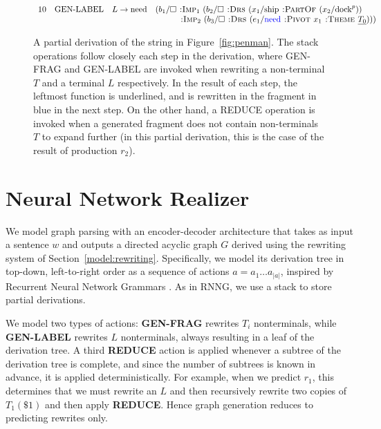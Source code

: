 \documentclass[11pt,a4paper]{article}
\theoremstyle{plain}
\begin{document}
\begin{figure*}
\begin{align*}
\begin{array}{rlll}
  10 & \textrm{GEN-LABEL} & L\rightarrow\textrm{need} &(b_1/\square \textsc{~:Imp}_1~(b_2/\square \textsc{~:Drs~} (x_1/\textrm{ship} \textsc{~:PartOf~} (x_2/\textrm{dock}^p))\\  
    & &  &\qquad~~\textsc{~:Imp}_2~(b_3/\square \textsc{~:Drs~} (e_1/\textcolor{blue}{\textrm{need}} \textsc{~:Pivot~} x_1 \textsc{~:Theme~} \underline{T_0})))
\end{array}
\end{align*}
\caption{A partial derivation of the string in Figure~\ref{fig:penman}. The stack operations follow closely each step in the derivation, where GEN-FRAG and GEN-LABEL are invoked when rewriting a non-terminal $T$ and a terminal $L$ respectively. In the result of each step, the leftmost function is underlined, and is rewritten in the fragment in blue in the next step. On the other hand, a REDUCE operation is invoked when a generated fragment does not contain non-terminals $T$ to expand further (in this partial derivation, this is the case of the result of production $r_2$).}
\label{fig:derivation}
\label{table:derivation}
\end{figure*}

\section{Neural Network Realizer}\label{model:nnr}

We model graph parsing with an encoder-decoder architecture that
takes as input a sentence $w$ and outputs a directed acyclic graph
$G$ derived using the rewriting system of
Section~\ref{model:rewriting}. Specifically, we model its derivation tree in top-down, left-to-right order as a sequence of actions $a = a_1 \dots a_{|a|}$, inspired by Recurrent Neural Network Grammars \cite[RNNG,][]{dyer2016recurrent}. As in RNNG, we use a stack to store partial derivations.

We model two types of actions: \textbf{GEN-FRAG} rewrites $T_i$
nonterminals, while \textbf{GEN-LABEL} rewrites
$L$ nonterminals, always resulting in a leaf of the derivation tree. A
third \textbf{REDUCE} action is applied whenever a subtree of the derivation tree is complete, and since the number of subtrees is known in advance, it is applied deterministically. For example, 
when we predict $r_1$, this determines that we
must rewrite an $L$ and then recursively rewrite two copies of $T_1(\$1)$ and then
apply \textbf{REDUCE}.
Hence graph generation reduces to predicting rewrites only.
\end{document}
